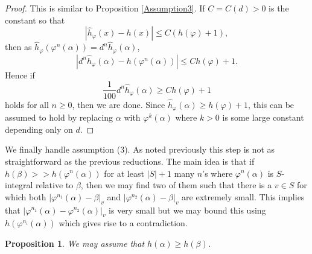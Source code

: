 \documentclass[10pt, reqno]{amsart}
\newcommand{\vphi}{\varphi}
\newcommand{\h}{\widehat{h}}
\numberwithin{theorem}{section}
\newtheorem{proposition}[theorem]{Proposition}
\numberwithin{equation}{section}
\numberwithin{example}{section}
\numberwithin{definition}{section}
\begin{document}
\begin{proof}
This is similar to Proposition \ref{Assumption3}. If $C = C(d) > 0$ is the constant so that 
$$|\h_{\vphi}(x) - h(x)| \leq C(h(\vphi)+1),$$
then as $\h_{\vphi}(\vphi^n(\alpha)) = d^n \h_{\vphi}(\alpha)$,
$$|d^n \h_{\vphi}(\alpha) - h(\vphi^n(\alpha))| \leq C h(\vphi)+1.$$
Hence if 
$$\frac{1}{100} d^n \h_{\vphi}(\alpha) \geq C h(\vphi)+1$$
holds for all $n \geq 0$, then we are done. Since $\h_{\vphi}(\alpha) \geq h(\vphi)+1$, this can be assumed to hold by replacing $\alpha$ with $\vphi^k(\alpha)$ where $k > 0$ is some large constant depending only on $d$.
\end{proof}

We finally handle assumption (3). As noted previously this step is not as straightforward as the previous reductions. The main idea is that if $h(\beta) >> h(\vphi^n(\alpha))$ for at least $|S|+1$ many $n$'s where $\vphi^n(\alpha)$ is $S$-integral relative to $\beta$, then we may find two of them such that there is a $v \in S$ for which both $|\vphi^{n_1}(\alpha) - \beta|_v$ and $|\vphi^{n_2}(\alpha) - \beta|_v$ are extremely small. This implies that $|\vphi^{n_1}(\alpha) - \vphi^{n_2}(\alpha)|_v$ is very small but we may bound this using $h(\vphi^{n_i}(\alpha))$ which gives rise to a contradiction.

\begin{proposition} \label{Assumption5}
We may assume that $h(\alpha) \geq h(\beta)$. 
\end{proposition}
\end{document}
